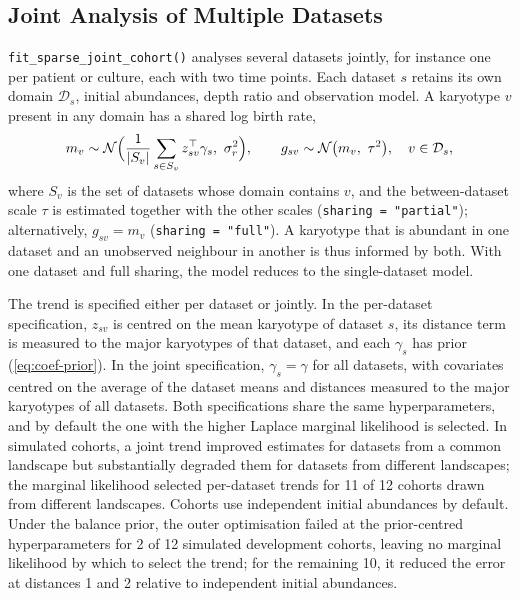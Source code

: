 \documentclass[11pt]{article}
\newcommand{\Normal}{\mathcal{N}}
\begin{document}
\subsection{Joint Analysis of Multiple Datasets}
\label{sec:sj-cohort}

\texttt{fit\_sparse\_joint\_cohort()} analyses several datasets jointly, for
instance one per patient or culture, each with two time points. Each
dataset $s$ retains its own domain $\mathcal{D}_s$, initial abundances, depth
ratio and observation model. A karyotype $v$ present in any domain has a
shared log birth rate,
\begin{equation}
  m_v\sim\Normal\Bigl(\frac{1}{|S_v|}\sum_{s\in S_v}z_{sv}^\top\gamma_s,\ \sigma_r^2\Bigr),
  \qquad
  g_{sv}\sim\Normal\bigl(m_v,\ \tau^2\bigr),\quad v\in\mathcal{D}_s,
  \label{eq:cohort}
\end{equation}
where $S_v$ is the set of datasets whose domain contains $v$, and the
between-dataset scale $\tau$ is estimated together with the other scales
(\texttt{sharing = "partial"}); alternatively, $g_{sv}=m_v$
(\texttt{sharing = "full"}). A karyotype that is abundant in one dataset and an
unobserved neighbour in another is thus informed by both. With one dataset and
full sharing, the model reduces to the single-dataset model.

The trend is specified either per dataset or jointly. In the per-dataset
specification, $z_{sv}$ is centred on the mean karyotype of dataset $s$, its
distance term is measured to the major karyotypes of that dataset, and each
$\gamma_s$ has prior (\ref{eq:coef-prior}). In the joint specification,
$\gamma_s=\gamma$ for all datasets, with covariates centred on the average of
the dataset means and distances measured to the major karyotypes of all
datasets. Both specifications share the same hyperparameters, and by default
the one with the higher Laplace marginal likelihood is selected. In simulated
cohorts, a joint trend improved estimates for datasets from a common landscape
but substantially degraded them for datasets from different landscapes; the
marginal likelihood selected per-dataset trends for 11 of 12 cohorts drawn
from different landscapes. Cohorts use independent initial abundances by
default. Under the balance prior, the outer optimisation failed at the
prior-centred hyperparameters for 2 of 12 simulated development cohorts,
leaving no marginal likelihood by which to select the trend; for the
remaining 10, it reduced the error at distances 1 and 2 relative to
independent initial abundances.
\end{document}
